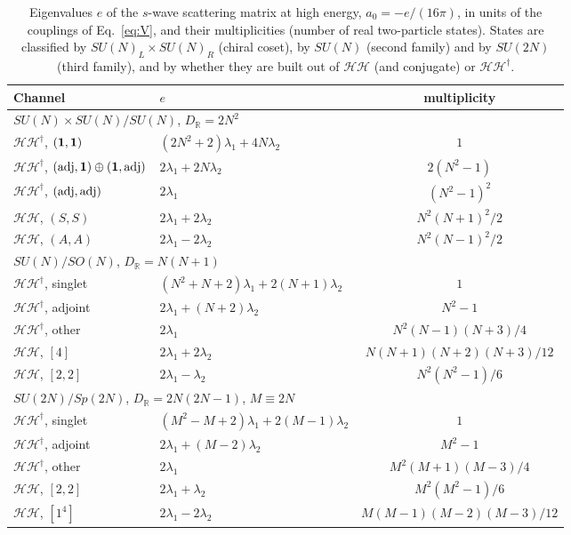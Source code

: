 \documentclass[aps,prd,twocolumn,superscriptaddress,nofootinbib,floatfix]{revtex4-2}
\theoremstyle{remark}
\newcommand{\Hf}{\mathcal{H}}      %
\begin{document}
\begin{table}[t]
\caption{Eigenvalues $e$ of the $s$-wave scattering matrix at high energy, $a_0=-e/(16\pi)$, in units of the couplings of Eq.~\eqref{eq:V}, and their multiplicities (number of real two-particle states). States are classified by $SU(N)_L\times SU(N)_R$ (chiral coset), by $SU(N)$ (second family) and by $SU(2N)$ (third family), and by whether they are built out of $\Hf\Hf$ (and conjugate) or $\Hf\Hf^\dagger$.}
\label{tab:unitarity}
\begin{ruledtabular}
\begin{tabular}{llc}
Channel & $e$ & multiplicity \\
\hline
\multicolumn{3}{l}{$SU(N)\times SU(N)/SU(N)$, $D_{\mathbb R}=2N^2$}\\
$\Hf\Hf^\dagger$, $({\bf 1},{\bf 1})$ & $(2N^2+2)\lambda_1+4N\lambda_2$ & $1$\\
$\Hf\Hf^\dagger$, $({\rm adj},{\bf 1})\oplus({\bf 1},{\rm adj})$ & $2\lambda_1+2N\lambda_2$ & $2(N^2-1)$\\
$\Hf\Hf^\dagger$, $({\rm adj},{\rm adj})$ & $2\lambda_1$ & $(N^2-1)^2$\\
$\Hf\Hf$, $(S,S)$ & $2\lambda_1+2\lambda_2$ & $N^2(N+1)^2/2$\\
$\Hf\Hf$, $(A,A)$ & $2\lambda_1-2\lambda_2$ & $N^2(N-1)^2/2$\\
\hline
\multicolumn{3}{l}{$SU(N)/SO(N)$, $D_{\mathbb R}=N(N+1)$}\\
$\Hf\Hf^\dagger$, singlet & $(N^2+N+2)\lambda_1+2(N+1)\lambda_2$ & $1$\\
$\Hf\Hf^\dagger$, adjoint & $2\lambda_1+(N+2)\lambda_2$ & $N^2-1$\\
$\Hf\Hf^\dagger$, other & $2\lambda_1$ & $N^2(N-1)(N+3)/4$\\
$\Hf\Hf$, $[4]$ & $2\lambda_1+2\lambda_2$ & $N(N+1)(N+2)(N+3)/12$\\
$\Hf\Hf$, $[2,2]$ & $2\lambda_1-\lambda_2$ & $N^2(N^2-1)/6$\\
\hline
\multicolumn{3}{l}{$SU(2N)/Sp(2N)$, $D_{\mathbb R}=2N(2N-1)$, $M\equiv2N$}\\
$\Hf\Hf^\dagger$, singlet & $(M^2-M+2)\lambda_1+2(M-1)\lambda_2$ & $1$\\
$\Hf\Hf^\dagger$, adjoint & $2\lambda_1+(M-2)\lambda_2$ & $M^2-1$\\
$\Hf\Hf^\dagger$, other & $2\lambda_1$ & $M^2(M+1)(M-3)/4$\\
$\Hf\Hf$, $[2,2]$ & $2\lambda_1+\lambda_2$ & $M^2(M^2-1)/6$\\
$\Hf\Hf$, $[1^4]$ & $2\lambda_1-2\lambda_2$ & $M(M-1)(M-2)(M-3)/12$
\end{tabular}
\end{ruledtabular}
\end{table}
\end{document}
